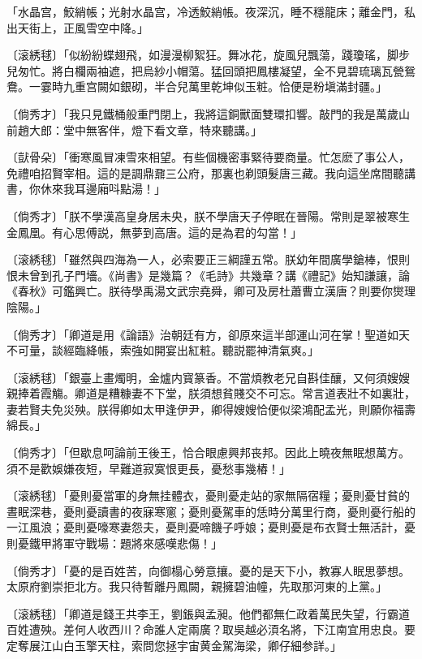 \begin{myquote}
「水晶宫，鮫綃帳；光射水晶宫，冷透鮫綃帳。夜深沉，睡不穩龍床；離金門，私出天街上，正風雪空中降。」　

{\markfont〔滚綉毬〕}「似紛紛蝶翅飛，如漫漫柳絮狂。舞冰花，旋風兒飄蕩，踐瓊瑤，脚步兒匆忙。將白欄兩袖遮，把烏紗小帽蕩。猛回頭把鳳樓凝望，全不見碧琉璃瓦甇鴛鴦。一霎時九重宫闕如銀砌，半合兒萬里乾坤似玉粧。恰便是粉塡滿封疆。」

{\markfont〔倘秀才〕}「我只見鐵桶般重門閉上，我將這銅獸面雙環扣響。敲門的我是萬歲山前趙大郎：堂中無客伴，燈下看文章，特來聽講。」

{\markfont〔獃骨朵〕}「衝寒風冒凍雪來相望。有些個機密事緊待要商量。忙怎麽了事公人，免禮咱招賢宰相。這的是調鼎鼐三公府，那裏也剃頭髮唐三藏。我向這坐席間聽講書，你休來我耳邊廂呌點湯！」

{\markfont〔倘秀才〕}「朕不學漢高皇身居未央，朕不學唐天子停眠在晉陽。常則是翠被寒生金鳳凰。有心思傅説，無夢到高唐。這的是為君的勾當！」

{\markfont〔滚綉毬〕}「雖然與四海為一人，必索要正三綱謹五常。朕幼年間廣學鎗棒，恨則恨未曾到孔子門墻。《尚書》是幾篇？《毛詩》共幾章？講《禮記》始知謙讓，論《春秋》可鑑興亡。朕待學禹湯文武宗堯舜，卿可及房杜蕭曹立漢唐？則要你爕理陰陽。」

{\markfont〔倘秀才〕}「卿道是用《論語》治朝廷有方，卻原來這半部運山河在掌！聖道如天不可量，談經臨絳帳，索強如開宴出紅粧。聽説罷神清氣爽。」

{\markfont〔滚綉毬〕}「銀臺上畫燭明，金爐内寳篆香。不當煩教老兄自斟佳釀，又何須嫂嫂親捧着霞觴。卿道是糟糠妻不下堂，朕須想貧賤交不可忘。常言道表壯不如裏壯，妻若賢夫免災殃。朕得卿如太甲逢伊尹，卿得嫂嫂恰便似梁鴻配孟光，則願你福壽綿長。」

{\markfont〔倘秀才〕}「但歇息呵論前王後王，恰合眼慮興邦丧邦。因此上曉夜無眠想萬方。須不是歡娛嫌夜短，早難道寂寞恨更長，憂愁事幾樁！」

{\markfont〔滚綉毬〕}「憂則憂當軍的身無挂體衣，憂則憂走站的家無隔宿糧；憂則憂甘貧的晝眠深巷，憂則憂讀書的夜寐寒窻；憂則憂駕車的恁時分萬里行商，憂則憂行船的一江風浪；憂則憂嚎寒妻怨夫，憂則憂啼饑子呼娘；憂則憂是布衣賢士無活計，憂則憂鐵甲將軍守戰場：題將來感嘆悲傷！」

{\markfont〔倘秀才〕}「憂的是百姓苦，向御榻心勞意攘。憂的是天下小，教寡人眠思夢想。太原府劉崇拒北方。我只待暫離丹鳳闕，親擁碧油幢，先取那河東的上黨。」

{\markfont〔滚綉毬〕}「卿道是錢王共李王，劉鋹與孟昶。他們都無仁政着萬民失望，行霸道百姓遭殃。差何人收西川？命誰人定兩廣？取吳越必湏名將，下江南宜用忠良。要定奪展江山白玉擎天柱，索問您拯宇宙黄金駕海梁，卿仔細参詳。」


\end{myquote}
